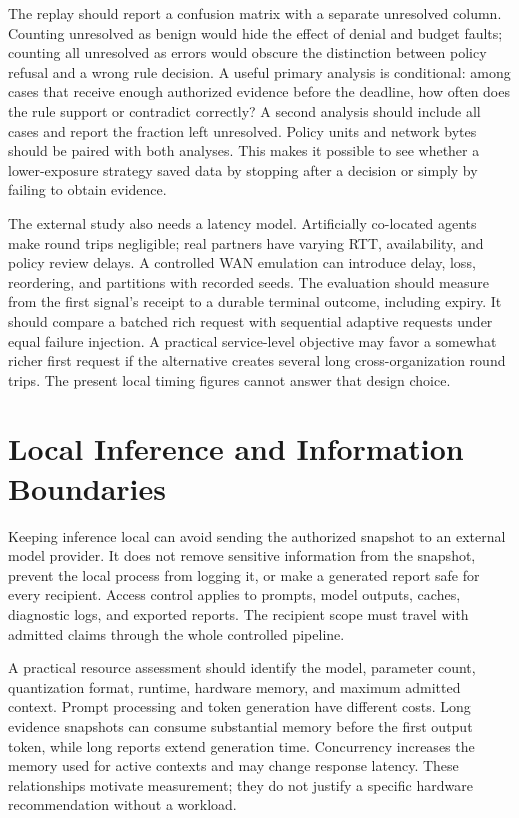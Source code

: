 The replay should report a confusion matrix with a separate unresolved column. Counting unresolved as benign would hide the effect of denial and budget faults; counting all unresolved as errors would obscure the distinction between policy refusal and a wrong rule decision. A useful primary analysis is conditional: among cases that receive enough authorized evidence before the deadline, how often does the rule support or contradict correctly? A second analysis should include all cases and report the fraction left unresolved. Policy units and network bytes should be paired with both analyses. This makes it possible to see whether a lower-exposure strategy saved data by stopping after a decision or simply by failing to obtain evidence.

The external study also needs a latency model. Artificially co-located agents make round trips negligible; real partners have varying RTT, availability, and policy review delays. A controlled WAN emulation can introduce delay, loss, reordering, and partitions with recorded seeds. The evaluation should measure from the first signal's receipt to a durable terminal outcome, including expiry. It should compare a batched rich request with sequential adaptive requests under equal failure injection. A practical service-level objective may favor a somewhat richer first request if the alternative creates several long cross-organization round trips. The present local timing figures cannot answer that design choice.


\section{Local Inference and Information Boundaries}
Keeping inference local can avoid sending the authorized snapshot to an external model provider. It does not remove sensitive information from the snapshot, prevent the local process from logging it, or make a generated report safe for every recipient. Access control applies to prompts, model outputs, caches, diagnostic logs, and exported reports. The recipient scope must travel with admitted claims through the whole controlled pipeline.

A practical resource assessment should identify the model, parameter count, quantization format, runtime, hardware memory, and maximum admitted context. Prompt processing and token generation have different costs. Long evidence snapshots can consume substantial memory before the first output token, while long reports extend generation time. Concurrency increases the memory used for active contexts and may change response latency. These relationships motivate measurement; they do not justify a specific hardware recommendation without a workload.


